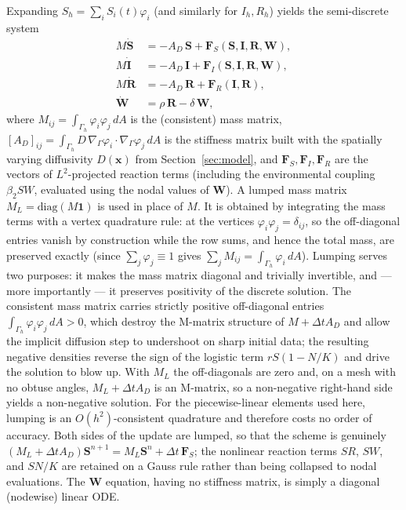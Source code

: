 \documentclass[11pt]{article}
\newcommand{\Grad}{\nabla_\Gamma}
\begin{document}
Expanding $S_h = \sum_i S_i(t)\varphi_i$ (and similarly for $I_h, R_h$) yields the semi-discrete system
\begin{align}
M\dot{\mathbf{S}} &= -A_D\,\mathbf{S} + \mathbf{F}_S(\mathbf{S},\mathbf{I},\mathbf{R},\mathbf{W}), \\
M\dot{\mathbf{I}} &= -A_D\,\mathbf{I} + \mathbf{F}_I(\mathbf{S},\mathbf{I},\mathbf{R},\mathbf{W}), \\
M\dot{\mathbf{R}} &= -A_D\,\mathbf{R} + \mathbf{F}_R(\mathbf{I},\mathbf{R}), \\
\dot{\mathbf{W}} &= \rho\,\mathbf{R} - \delta\,\mathbf{W},
\end{align}
where $M_{ij} = \int_{\Gamma_h}\varphi_i\varphi_j\,dA$ is the (consistent) mass matrix, $[A_D]_{ij} = \int_{\Gamma_h} D\,\Grad\varphi_i\cdot\Grad\varphi_j\,dA$ is the stiffness matrix built with the spatially varying diffusivity $D(\mathbf{x})$ from Section~\ref{sec:model}, and $\mathbf{F}_S,\mathbf{F}_I,\mathbf{F}_R$ are the vectors of $L^2$-projected reaction terms (including the environmental coupling $\beta_2 S W$, evaluated using the nodal values of $\mathbf{W}$). A lumped mass matrix $M_L = \mathrm{diag}(M\mathbf{1})$ is used in place of $M$. It is obtained by integrating the mass terms with a vertex quadrature rule: at the vertices $\varphi_i\varphi_j = \delta_{ij}$, so the off-diagonal entries vanish by construction while the row sums, and hence the total mass, are preserved exactly (since $\sum_j\varphi_j\equiv1$ gives $\sum_j M_{ij} = \int_{\Gamma_h}\varphi_i\,dA$). Lumping serves two purposes: it makes the mass matrix diagonal and trivially invertible, and --- more importantly --- it preserves positivity of the discrete solution. The consistent mass matrix carries strictly positive off-diagonal entries $\int_{\Gamma_h}\varphi_i\varphi_j\,dA>0$, which destroy the M-matrix structure of $M+\Delta t A_D$ and allow the implicit diffusion step to undershoot on sharp initial data; the resulting negative densities reverse the sign of the logistic term $rS(1-N/K)$ and drive the solution to blow up. With $M_L$ the off-diagonals are zero and, on a mesh with no obtuse angles, $M_L + \Delta t A_D$ is an M-matrix, so a non-negative right-hand side yields a non-negative solution. For the piecewise-linear elements used here, lumping is an $O(h^2)$-consistent quadrature and therefore costs no order of accuracy. Both sides of the update are lumped, so that the scheme is genuinely $(M_L+\Delta t A_D)\mathbf{S}^{n+1} = M_L\mathbf{S}^n + \Delta t\,\mathbf{F}_S$; the nonlinear reaction terms $SR$, $SW$, and $SN/K$ are retained on a Gauss rule rather than being collapsed to nodal evaluations. The $\mathbf{W}$ equation, having no stiffness matrix, is simply a diagonal (nodewise) linear ODE.
\end{document}
